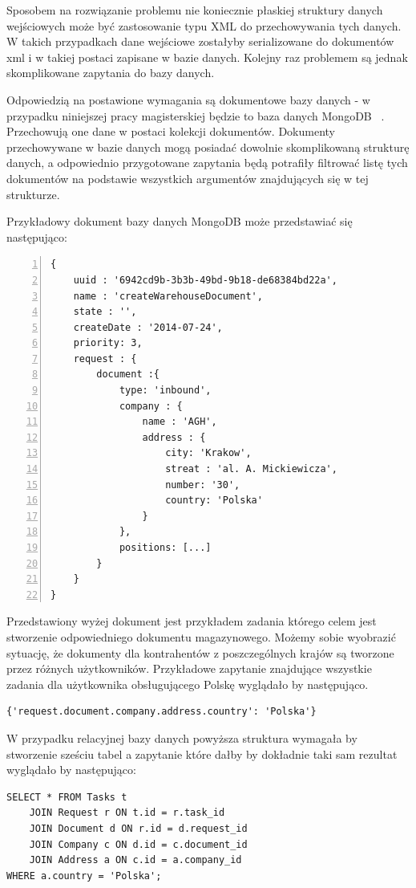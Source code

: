 Sposobem na rozwiązanie problemu nie koniecznie płaskiej struktury danych wejściowych może być zastosowanie typu XML do przechowywania tych danych. W takich przypadkach dane wejściowe zostałyby serializowane do dokumentów xml i w takiej postaci zapisane w bazie danych. Kolejny raz problemem są jednak skomplikowane zapytania do bazy danych. 

Odpowiedzią na postawione wymagania są dokumentowe bazy danych - w przypadku niniejszej pracy magisterskiej będzie to baza danych MongoDB ~\cite{mongodb}. Przechowują one dane w postaci kolekcji dokumentów. Dokumenty przechowywane w bazie danych mogą posiadać dowolnie skomplikowaną strukturę danych, a odpowiednio przygotowane zapytania będą potrafiły filtrować  listę tych dokumentów na podstawie wszystkich argumentów znajdujących się w tej strukturze. 

Przykładowy dokument bazy danych MongoDB może przedstawiać się następująco:

\begin{lstlisting}[caption=Zadanie w postaci dokumentu MongoDB.,numbers=left]
{	
	uuid : '6942cd9b-3b3b-49bd-9b18-de68384bd22a',
	name : 'createWarehouseDocument',
	state : '',
	createDate : '2014-07-24',
	priority: 3,
	request : {
		document :{
			type: 'inbound',
			company : {
				name : 'AGH',
				address : {
					city: 'Krakow',
					streat : 'al. A. Mickiewicza',
					number: '30',
					country: 'Polska'
				}
			},
			positions: [...]
		}
	}
}
\end{lstlisting}


Przedstawiony wyżej dokument jest przykładem zadania którego celem jest stworzenie odpowiedniego dokumentu magazynowego. Możemy sobie wyobrazić sytuację, że dokumenty dla kontrahentów z poszczególnych krajów są tworzone przez różnych użytkowników. Przykładowe zapytanie znajdujące wszystkie zadania dla użytkownika obsługującego Polskę wyglądało by następująco. 

\begin{lstlisting}[caption=Zapytanie MongoDB.]
{'request.document.company.address.country': 'Polska'}
\end{lstlisting}

W przypadku relacyjnej bazy danych powyższa struktura wymagała by stworzenie sześciu tabel a zapytanie które dałby by dokładnie taki sam rezultat wyglądało by następująco:

\begin{lstlisting}[caption=Zapytanie SQL.]
SELECT * FROM Tasks t 
	JOIN Request r ON t.id = r.task_id
	JOIN Document d ON r.id = d.request_id
	JOIN Company c ON d.id = c.document_id
	JOIN Address a ON c.id = a.company_id
WHERE a.country = 'Polska';
\end{lstlisting}


